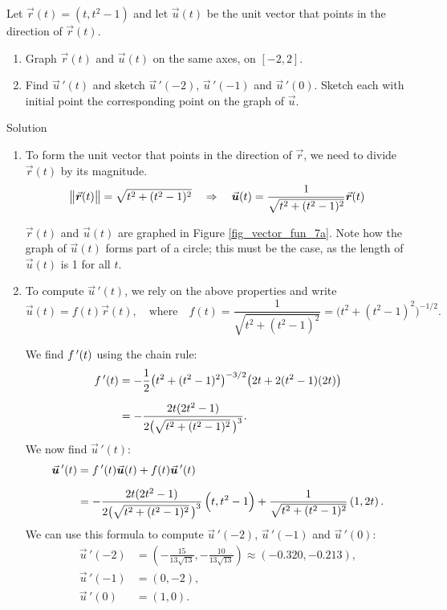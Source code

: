 \begin{example}\label{ex_vvfderiv2}
Let $\vec r(t) = \left( t, t^2-1\right)$ and let $\vec u(t)$ be the unit vector that points in the direction of $\vec r(t)$.
\begin{enumerate}
	\item Graph $\vec r(t)$ and $\vec u(t)$ on the same axes, on $[-2,2]$.
	\item	Find $\vec u\,'(t)$ and sketch $\vec u\,'(-2)$, $\vec u\,'(-1)$ and $\vec u\,'(0)$. Sketch each with initial point the corresponding point on the graph of $\vec u$.
\end{enumerate}

Solution 


\begin{enumerate}
	\item To form the unit vector that points in the direction of $\vec r$, we need to divide $\vec r(t)$ by its magnitude. 
	$$\norm{\vec r(t)} = \sqrt{t^2+(t^2-1)^2} \quad \Rightarrow \quad \vec u(t) = \frac{1}{\sqrt{t^2+(t^2-1)^2}}\vec r(t)$$
	
	$\vec r(t)$ and $\vec u(t)$ are graphed in Figure \ref{fig_vector_fun_7a}. Note how the graph of $\vec u(t)$ forms part of a circle; this must be the case, as the length of $\vec u(t)$ is 1 for all $t$.

	
	\item To compute $\vec u\,'(t)$, we rely on the above properties and write $$\vec u(t) = f(t)\vec r(t),\quad  \text{where}\quad f(t) = \frac{1}{\sqrt{t^2+(t^2-1)^2}}=\big(t^2+(t^2-1)^2\big)^{-1/2}.$$ 
	
We find $f\,'(t)$ using the chain rule:
\begin{align*}
f\,'(t) &= -\frac12\big(t^2+(t^2-1)^2\big)^{-3/2}\big(2t+2(t^2-1)(2t)\big)\\[0.2cm]
			&= -\frac{2t(2t^2-1)}{2\big(\sqrt{t^2+(t^2-1)^2}\,\big)^3}.
\end{align*}
We now find $\vec u\,'(t)$:
\begin{align*}
\vec u\,'(t) &=  \fp(t)\vec u(t) + f(t)\vec u\,'(t) \\[0.2cm]
				&=  -\frac{2t(2t^2-1)}{2\big(\sqrt{t^2+(t^2-1)^2}\,\big)^3}\left( t,t^2-1\right) + \frac{1}{\sqrt{t^2+(t^2-1)^2}}\left( 1,2t\right).
\end{align*}
 We can use this formula to compute $\vec u\,'(-2)$, $\vec u\,'(-1)$ and $\vec u\,'(0)$:
\begin{align*}
\vec u\,'(-2) &= \left(-\frac{15}{13 \sqrt{13}},-\frac{10}{13
   \sqrt{13}}\right) \approx \left( -0.320,-0.213\right),\\[0.2cm]
\vec u\,'(-1) &= \left( 0,-2\right),\\
\vec u\,'(0) &= \left( 1,0\right).
\end{align*}


\end{enumerate}
\end{example}
